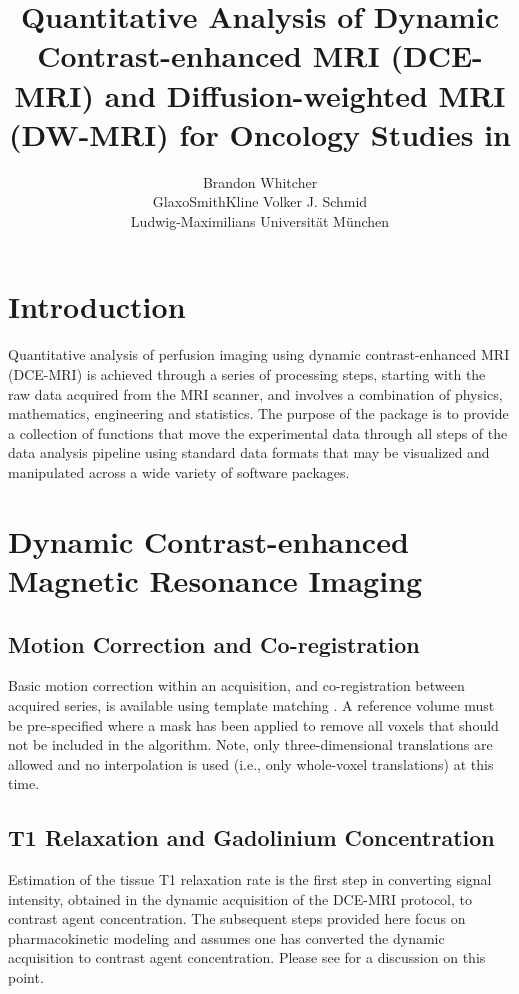 \documentclass[article]{jss}
\author{Brandon Whitcher\\GlaxoSmithKline \And 
        Volker J. Schmid\\Ludwig-Maximilians Universit\"at M\"unchen}
\title{Quantitative Analysis of Dynamic Contrast-enhanced {MRI} ({DCE-MRI}) and Diffusion-weighted {MRI} ({DW-MRI}) for Oncology Studies in \proglang{R}}
\begin{document}

\section[Introduction]{Introduction}

Quantitative analysis of perfusion imaging using dynamic
contrast-enhanced MRI (DCE-MRI) is achieved through a series of
processing steps, starting with the raw data acquired from the MRI
scanner, and involves a combination of physics, mathematics,
engineering and statistics.  The purpose of the  package
is to provide a collection of functions that move the experimental
data through all steps of the data analysis pipeline using standard
data formats that may be visualized and manipulated across a wide
variety of software packages.  

\section[Dynamic Contrast-enhanced Magnetic Resonance Imaging]{Dynamic Contrast-enhanced Magnetic Resonance Imaging}

\subsection[Motion Correction and Co-registration]{Motion Correction and Co-registration}

Basic motion correction within an acquisition, and co-registration
between acquired series, is available using template matching
\citep{lew:template-matching}.  A reference volume must be
pre-specified where a mask has been applied to remove all voxels that
should not be included in the algorithm.  Note, only three-dimensional
translations are allowed and no interpolation is used (i.e., only
whole-voxel translations) at this time.

\subsection[T1 Relaxation and Gadolinium Concentration]{T1 Relaxation and Gadolinium Concentration}

Estimation of the tissue T1 relaxation rate is the first step in
converting signal intensity, obtained in the dynamic acquisition of
the DCE-MRI protocol, to contrast agent concentration.  The subsequent
steps provided here focus on pharmacokinetic modeling and assumes one
has converted the dynamic acquisition to contrast agent concentration.
Please see \cite{col-pad:ieee} for a discussion on this point.
\end{document}
